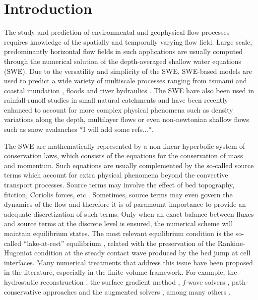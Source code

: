 \section{Introduction}

The study and prediction of environmental and geophysical flow processes requires knowledge of the spatially and temporally varying flow field.  Large scale, predominantly horizontal flow fields in such applications are usually computed through the numerical solution of the depth-averaged shallow water equations (SWE).  Due to the versatility and simplicity of the SWE, SWE-based models are used to predict a wide variety of multiscale processes ranging from tsunami and coastal inundation \cite{Marras:2016, Vater2019, Qin:2019}, floods \cite{George2011, Echeverribar2019} and river hydraulics \cite{Persi:2019}.  The SWE have also been used in rainfall-runoff studies in small natural catchments \cite{Mugler2011,   Lacasta2014, Simons2014, Xia2019, CaviedesVoullieme2020} and have been recently enhanced to account for more complex physical phenomena such as density variations along the depth, multilayer flows or even non-newtonian shallow flows such as snow avalanches {*I will add some refs...*}.

The SWE are mathematically represented by a non-linear hyperbolic system of conservation laws, which consists of the equations for the conservation of mass and momentum. Such equations are usually complemented by the so-called source terms which account for extra physical phenomena beyond the convective transport processes. Source terms may involve the effect of bed topography, friction, Coriolis forces, etc \cite{Kesserwani2013}. Sometimes, source terms may even govern the dynamics of the flow and therefore it is of paramount importance to provide an adequate discretization of such terms.  Only when an exact balance between fluxes and source terms at the discrete level  is ensured, the numerical scheme will maintain equilibrium states.  The most relevant equilibrium condition is the so-called ``lake-at-rest'' equilibrium \cite{bermude2}, related with the preservation of the Rankine-Hugoniot condition at the steady contact wave produced by the bed jump at cell interfaces.  Many numerical treatments that address this issue have been proposed in the literature, especially in the finite volume framework.  For example, the hydrostatic reconstruction \cite{audusse}, the surface gradient method \cite{zhou}, $f$-wave solvers \cite{George:2008,LeVeque:2011}, path-conservative approaches \cite{Gosse:2001,  LeVeque:2011} and the augmented solvers \cite{NavasMontilla2020}, among many others \cite{xing2006,CALEFFI2016}.

